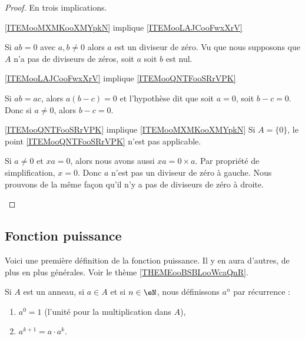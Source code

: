 \begin{proof}
    En trois implications.
    \begin{subproof}
        \item[\ref{ITEMooMXMKooXMYpkN} implique \ref{ITEMooLAJCooFwxXrV}]

            Si \( ab=0\) avec \( a,b\neq 0\) alors \( a\) est un diviseur de zéro. Vu que nous supposons que \( A\) n'a pas de diviseurs de zéros, soit \( a\) soit \( b\) est nul.
        \item[\ref{ITEMooLAJCooFwxXrV} implique \ref{ITEMooQNTFooSRrVPK}]

            Si \( ab=ac\), alors \( a(b-c)=0\) et l'hypothèse dit que soit \( a=0\), soit \( b-c=0\). Donc si \( a\neq 0\), alors \( b-c=0\).
        \item[\ref{ITEMooQNTFooSRrVPK} implique \ref{ITEMooMXMKooXMYpkN}]
            Si \( A=\{ 0 \}\), le point \ref{ITEMooQNTFooSRrVPK} n'est pas applicable.

            Si \( a\neq 0\) et \( xa=0\), alors nous avons aussi \( xa=0\times a\). Par propriété de simplification, \( x=0\). Donc \( a\) n'est pas un diviseur de zéro à gauche. Nous prouvons de la même façon qu'il n'y a pas de diviseurs de zéro à droite.
    \end{subproof}
\end{proof}


\subsection{Fonction puissance}

Voici une première définition de la fonction puissance. Il y en aura d'autres, de plus en plus générales. Voir le thème \ref{THEMEooBSBLooWcaQnR}.
\begin{definition}\label{DEFooGVSFooFVLtNo}
    Si \( A\) est un anneau, si \( a\in A\) et si \( n\in \eN\), nous définissons \( a^n\) par récurrence :
    \begin{enumerate}
        \item
            \( a^0=1\) (l'unité pour la multiplication dans \( A\)),
        \item       \label{ITEMooOUIPooGjAgQb}
            \( a^{k+1}=a\cdot a^{k}\).
    \end{enumerate}
\end{definition}

